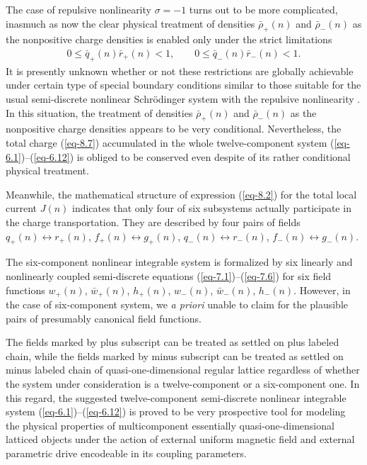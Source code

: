 \documentclass[pdftex]{sigma}
\numberwithin{equation}{section}
\begin{document}
The case of repulsive nonlinearity $\sigma=-1$ turns out to be more complicated, inasmuch as now the clear physical treatment of densities $\bar{\rho}_{+}(n)$ and $\bar{\rho}_{-}(n)$ as the nonpositive charge densities is enabled only under the strict limitations
\begin{gather*}%
	0 \leq \bar{q}_{+}(n)\bar{r}_{+}(n) < 1,
\qquad %
	0 \leq \bar{q}_{-}(n)\bar{r}_{-}(n) < 1 .
\end{gather*}
It is presently unknown whether or not these restrictions are globally achievable under certain type of special boundary conditions similar to those suitable for the usual semi-discrete nonlinear Schr\"{o}dinger system with the repulsive nonlinearity \cite{chubykalo-PLA-169-359, konotop-JPA-25-4037, vekslerchik-IP-8-889}. In this situation, the treatment of densities $\bar{\rho}_{+}(n)$ and $\bar{\rho}_{-}(n)$ as the nonpositive charge densities appears to be very conditional. Nevertheless, the total charge (\ref{eq-8.7})
accumulated in the whole twelve-component system \mbox{(\ref{eq-6.1})--(\ref{eq-6.12})} is obliged to be conserved even despite of its rather conditional physical treatment.

Meanwhile, the mathematical structure of expression (\ref{eq-8.2}) for the total local current $J(n)$ indicates that only four of six subsystems actually participate in the charge transportation. They are described by four pairs of fields $q_{+}(n)\leftrightarrow r_{+}(n)$, $f_{+}(n)\leftrightarrow g_{+}(n)$, $q_{-}(n)\leftrightarrow r_{-}(n)$, $f_{-}(n)\leftrightarrow g_{-}(n)$.

The six-component nonlinear integrable system is formalized by six linearly and nonlinearly coupled semi-discrete equations (\ref{eq-7.1})--(\ref{eq-7.6}) for six field functions $w_{+}(n)$, $\bar{w}_{+}(n)$, $h_{+}(n)$, $w_{-}(n)$, $\bar{w}_{-}(n)$, $h_{-}(n)$. However, in the case of six-component system, we \textit{a priori} unable to claim for the plausible pairs of presumably canonical field functions.

The fields marked by plus subscript can be treated as settled on plus labeled chain, while the fields marked by minus subscript can be treated as settled on minus labeled chain of quasi-one-dimensional regular lattice regardless of whether the system under consideration is a twelve-component or a six-component one. In this regard, the suggested twelve-component semi-discrete nonlinear integrable system (\ref{eq-6.1})--(\ref{eq-6.12}) is proved to be very prospective tool for modeling the physical properties of multicomponent essentially quasi-one-dimensional latticed objects under the action of external uniform magnetic field and external parametric drive encodeable in its coupling parameters.
\end{document}
